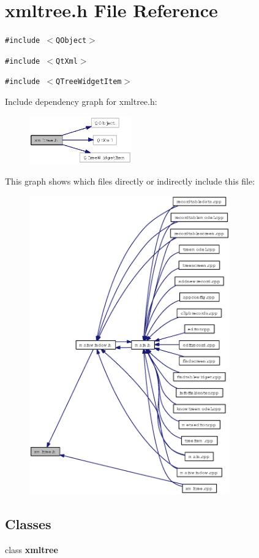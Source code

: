 \section{xmltree.h File Reference}
\label{xmltree_8h}
{\tt \#include $<$QObject$>$}\par
{\tt \#include $<$Qt\-Xml$>$}\par
{\tt \#include $<$QTree\-Widget\-Item$>$}\par


Include dependency graph for xmltree.h:\begin{figure}[H]
\begin{center}
\leavevmode
\includegraphics[width=125pt]{xmltree_8h__incl}
\end{center}
\end{figure}


This graph shows which files directly or indirectly include this file:\begin{figure}[H]
\begin{center}
\leavevmode
\includegraphics[width=245pt]{xmltree_8h__dep__incl}
\end{center}
\end{figure}
\subsection*{Classes}
\begin{CompactItemize}
\item 
class {\bf xmltree}
\end{CompactItemize}
